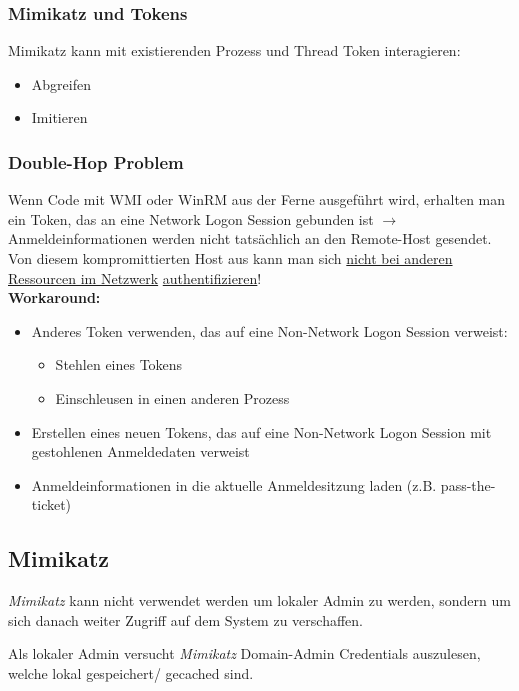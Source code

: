 \subsubsection{Mimikatz und Tokens}
Mimikatz kann mit existierenden Prozess und Thread Token interagieren:
\begin{itemize}
    \item Abgreifen
    \item Imitieren
\end{itemize}

\subsubsection{Double-Hop Problem}
Wenn Code mit WMI oder WinRM aus der Ferne ausgeführt wird, erhalten man ein Token, das an eine Network Logon Session gebunden ist $\rightarrow$ Anmeldeinformationen werden nicht tatsächlich an den Remote-Host gesendet.\\
Von diesem kompromittierten Host aus kann man sich \underline{nicht bei anderen Ressourcen im Netzwerk} \underline{authentifizieren}!\\
\textbf{Workaround:}
\begin{itemize}
    \item Anderes Token verwenden, das auf eine Non-Network Logon Session verweist:
    \begin{itemize}
        \item Stehlen eines Tokens
        \item Einschleusen in einen anderen Prozess
    \end{itemize}
    \item Erstellen eines neuen Tokens, das auf eine Non-Network Logon Session mit gestohlenen Anmeldedaten verweist
    \item Anmeldeinformationen in die aktuelle Anmeldesitzung laden (z.B. pass-the-ticket)
\end{itemize}

\subsection{Mimikatz}
\textit{Mimikatz} kann nicht verwendet werden um lokaler Admin zu werden, sondern um sich danach weiter Zugriff auf dem System zu verschaffen.

Als lokaler Admin versucht \textit{Mimikatz} Domain-Admin Credentials auszulesen, welche lokal gespeichert/ gecached sind.


